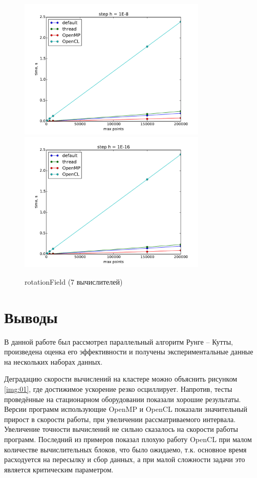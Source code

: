 \documentclass[14pt,final,titlepage,pscyr]{hedwork}
\begin{document}
\begin{figure}[ht!]
    \center
    \includegraphics[width=0.8\textwidth]{rotationField_my_1E-8}
    \includegraphics[width=0.8\textwidth]{rotationField_my_1E-16}
    \caption{rotationField (7 вычислителей)}
\end{figure}

\newpage

\section{Выводы}
В данной работе был рассмотрел параллельный алгоритм Рунге -- Кутты, произведена оценка его эффективности 
и получены экспериментальные данные на нескольких наборах данных.

Деградацию скорости вычислений на кластере можно объяснить рисунком \ref{img:01}, где достижимое 
ускорение резко осциллирует. Напротив, тесты проведённые на стационарном оборудовании показали хорошие 
результаты. Версии программ использующие OpenMP и OpenCL показали значительный прирост в скорости работы, 
при увеличении рассматриваемого интервала. Увеличение точности вычислений не сильно сказалось на скорости 
работы программ. Последний из примеров показал плохую работу OpenCL при малом количестве вычислительных 
блоков, что было ожидаемо, т.к. основное время расходуется на пересылку и сбор данных, а при малой 
сложности задачи это является критическим параметром.
\end{document}
